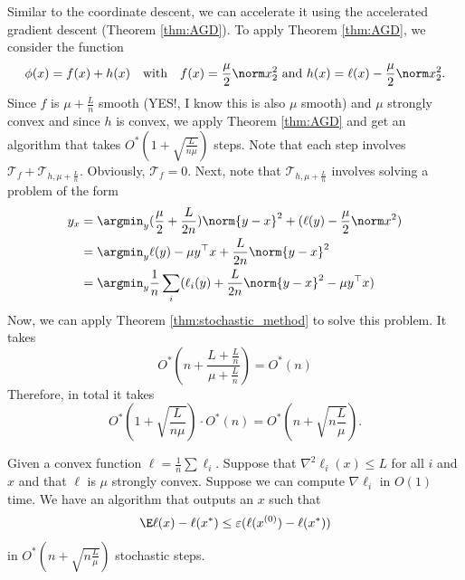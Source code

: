 Similar to the coordinate descent, we can accelerate it using the
accelerated gradient descent (Theorem \ref{thm:AGD}). To apply Theorem
\ref{thm:AGD}, we consider the function 
\[
\phi(x)=f(x)+h(x)\quad\text{with}\quad f(x)=\frac{\mu}{2}\norm x_{2}^{2}\text{ and }h(x)=\ell(x)-\frac{\mu}{2}\norm x_{2}^{2}.
\]
Since $f$ is $\mu+\frac{L}{n}$ smooth (YES!, I know this is also
$\mu$ smooth) and $\mu$ strongly convex and since $h$ is convex,
we apply Theorem \ref{thm:AGD} and get an algorithm that takes $O^{*}(1+\sqrt{\frac{L}{n\mu}})$
steps. Note that each step involves $\mathcal{T}_{f}+\mathcal{T}_{h,\mu+\frac{L}{n}}$.
Obviously, $\mathcal{T}_{f}=0$. Next, note that $\mathcal{T}_{h,\mu+\frac{L}{n}}$
involves solving a problem of the form
\begin{align*}
y_{x} & =\argmin_{y}(\frac{\mu}{2}+\frac{L}{2n})\norm{y-x}^{2}+(\ell(y)-\frac{\mu}{2}\norm x^{2})\\
 & =\argmin_{y}\ell(y)-\mu y^{\top}x+\frac{L}{2n}\norm{y-x}^{2}\\
 & =\argmin_{y}\frac{1}{n}\sum_{i}(\ell_{i}(y)+\frac{L}{2n}\norm{y-x}^{2}-\mu y^{\top}x)
\end{align*}
Now, we can apply Theorem \ref{thm:stochastic_method} to solve this
problem. It takes 
\[
O^{*}(n+\frac{L+\frac{L}{n}}{\mu+\frac{L}{n}})=O^{*}(n)
\]
Therefore, in total it takes
\[
O^{*}(1+\sqrt{\frac{L}{n\mu}})\cdot O^{*}(n)=O^{*}(n+\sqrt{n\frac{L}{\mu}}).
\]

\begin{thm}
\label{thm:acc_stochastic_method}Given a convex function $\ell=\frac{1}{n}\sum\ell_{i}$.
Suppose that $\nabla^{2}\ell_{i}(x)\leq L$ for all $i$ and $x$
and that $\ell$ is $\mu$ strongly convex. Suppose we can compute
$\nabla\ell_{i}$ in $O(1)$ time. We have an algorithm that outputs
an $x$ such that 
\[
\E\ell(x)-\ell(x^{*})\leq\varepsilon(\ell(x^{(0)})-\ell(x^{*}))
\]
in $O^{*}(n+\sqrt{n\frac{L}{\mu}})$ stochastic steps.
\end{thm}


